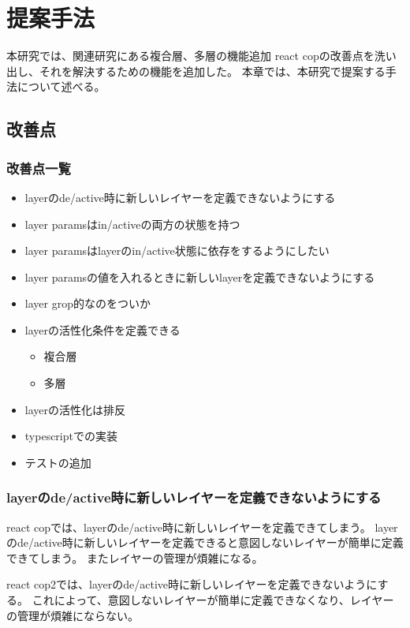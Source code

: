 \documentclass{jsarticle}
\begin{document}
    \fi
    \section{提案手法}
    本研究では、関連研究にある複合層、多層の機能追加
    react copの改善点を洗い出し、それを解決するための機能を追加した。
    本章では、本研究で提案する手法について述べる。

    \subsection{改善点}

    \subsubsection{改善点一覧}
    \begin{itemize}
    \item layerのde/active時に新しいレイヤーを定義できないようにする
    \item layer paramsはin/activeの両方の状態を持つ
    \item layer paramsはlayerのin/active状態に依存をするようにしたい
    \item layer paramsの値を入れるときに新しいlayerを定義できないようにする
    \item layer grop的なのをついか
    \item layerの活性化条件を定義できる
    \begin{itemize}
    \item 複合層
    \item 多層
    \end{itemize}
    \item layerの活性化は排反
    \item typescriptでの実装
    \item テストの追加
    \end{itemize}

    \subsubsection{layerのde/active時に新しいレイヤーを定義できないようにする}
    react copでは、layerのde/active時に新しいレイヤーを定義できてしまう。
    layerのde/active時に新しいレイヤーを定義できると意図しないレイヤーが簡単に定義できてしまう。
    またレイヤーの管理が煩雑になる。

    react cop2では、layerのde/active時に新しいレイヤーを定義できないようにする。
    これによって、意図しないレイヤーが簡単に定義できなくなり、レイヤーの管理が煩雑にならない。
\end{document}
